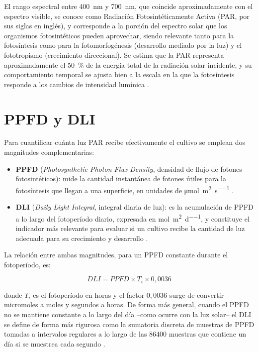 El rango espectral entre \SI{400}{\nano\meter} y \SI{700}{\nano\meter}, que coincide aproximadamente con el espectro visible, se conoce como Radiación Fotosintéticamente Activa (PAR, por sus siglas en inglés), y corresponde a la porción del espectro solar que los organismos fotosintéticos pueden aprovechar, siendo relevante tanto para la fotosíntesis como para la fotomorfogénesis (desarrollo mediado por la luz) y el fototropismo (crecimiento direccional). Se estima que la PAR representa aproximadamente el \SI{50}{\percent} de la energía total de la radiación solar incidente, y su comportamiento temporal se ajusta bien a la escala en la que la fotosíntesis responde a los cambios de intensidad lumínica \cite{deocampo2017, najera2023}.

\section{PPFD y DLI}
\label{sec:ppfd_dli}

Para cuantificar cuánta luz PAR recibe efectivamente el cultivo se emplean dos magnitudes complementarias:

\begin{itemize}
    \item \textbf{PPFD} (\textit{Photosynthetic Photon Flux Density}, densidad de flujo de fotones fotosintéticos): mide la cantidad instantánea de fotones útiles para la fotosíntesis que llegan a una superficie, en unidades de \si{\micro\mole\per\square\meter\per\second} \cite{najera2023}.
    \item \textbf{DLI} (\textit{Daily Light Integral}, integral diaria de luz): es la acumulación de PPFD a lo largo del fotoperíodo diario, expresada en \si{\mole\per\square\meter\per\day}, y constituye el indicador más relevante para evaluar si un cultivo recibe la cantidad de luz adecuada para su crecimiento y desarrollo \cite{najera2023}.
\end{itemize}

La relación entre ambas magnitudes, para un PPFD constante durante el fotoperíodo, es:

\begin{equation}
    DLI = PPFD \times T_i \times 0{,}0036
    \label{eq:dli_ppfd}
\end{equation}

\noindent donde $T_i$ es el fotoperíodo en horas y el factor $0{,}0036$ surge de convertir micromoles a moles y segundos a horas. De forma más general, cuando el PPFD no se mantiene constante a lo largo del día --como ocurre con la luz solar-- el DLI se define de forma más rigurosa como la sumatoria discreta de muestras de PPFD tomadas a intervalos regulares a lo largo de las \num{86400} muestras que contiene un día si se muestrea cada segundo \cite{deocampo2017}.

